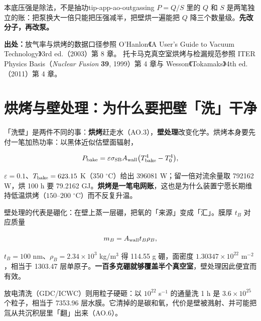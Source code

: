 \begin{tip}{本底压强是除法，不是抽功}{tip-app-ao-outgassing}
$P=Q/S$ 里的 $Q$ 和 $S$ 是两笔独立的账：把泵换大一倍只能把压强减半，把壁烘一遍能把 $Q$ 降三个数量级。\textbf{先改分子，再改泵。}
\end{tip}

{\small

\textbf{出处：}放气率与烘烤的数据口径参照 O'Hanlon《A User's Guide to Vacuum Technology》3rd ed.（2003）第 8 章。
托卡马克真空室烘烤与检漏规范参照 ITER Physics Basis（\textit{Nuclear Fusion} \textbf{39}, 1999）第 4 章与 Wesson《Tokamaks》4th ed.（2011）第 4 章。
}

\section{烘烤与壁处理：为什么要把壁「洗」干净}
\label{sec:app-ao-conditioning}

「洗壁」是两件不同的事：\textbf{烘烤}赶走水（AO.3），\textbf{壁处理}改变化学。烘烤本身要先付一笔加热功率：以黑体近似估壁面辐射，

\begin{equation}
P_{\rm bake}=\varepsilon\sigma_{\rm SB}A_{\rm wall}\big(T_{\rm bake}^{4}-T_{0}^{4}\big),
\label{eq:app-ao-bakepower}
\end{equation}

$\varepsilon=0.1$、$T_{\rm bake}=623.15$ K（350 $^\circ$C）给出 396081 W；留一倍对流余量取 792162 W，烘 100 h 要 79.2162 GJ。\textbf{烘烤是一笔电网账}，这也是为什么装置宁愿长期维持低温烘烤（$150$--$200$ $^\circ$C）而不反复升温。

壁处理的代表是硼化：在壁上蒸一层硼，把氧的「来源」变成「汇」。膜厚 $t_B$ 对应质量

\begin{equation}
m_B=A_{\rm wall}t_B\rho_B,
\label{eq:app-ao-boron}
\end{equation}

$t_B=100$ nm、$\rho_B=2.34\times10^{3}$ kg/m$^3$ 得 114.55 g 硼，面密度 $1.30347\times10^{22}$ m$^{-2}$，相当于 1303.47 层单原子。\textbf{一百多克硼就够覆盖半个真空室}，壁处理因此便宜而有效。

放电清洗（GDC/ICWC）则用粒子硬砸：以 $10^{22}$ s$^{-1}$ 的通量洗 1 h 是 $3.6\times10^{25}$ 个粒子，相当于 7353.96 层水膜。它清掉的是碳和氧，代价是壁被溅射、并可能把氚从共沉积层里「翻」出来（AO.6）。

